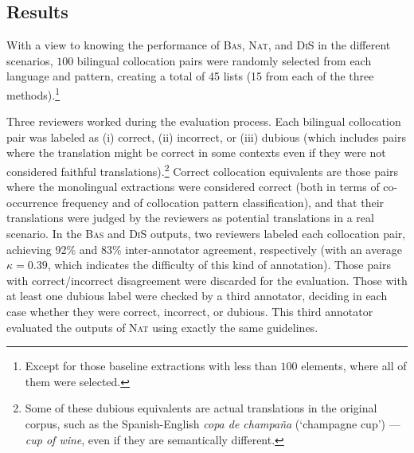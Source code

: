 \documentclass[output=paper
,modfonts
,nonflat]{langsci/langscibook}
\begin{document}
%
\subsection{Results}
With a view to knowing the performance of \textsc{Bas}, \textsc{Nat}, and \textsc{DiS}
in the different scenarios, $100$ bilingual collocation pairs were randomly selected
from each language and pattern, creating a total of 45 lists (15 from each of the three methods).\footnote{Except for those baseline extractions with less than $100$ elements, where all of them were selected.}

Three reviewers worked during the evaluation process. Each bilingual collocation
pair was labeled as (i) correct, (ii) incorrect, or (iii) dubious (which includes pairs where the
translation might be correct in some contexts even if they were not considered faithful
translations).\footnote{Some of these dubious equivalents are actual translations in the
  original corpus, such as the Spanish-English \textit{copa de champaña} (`champagne cup') --- \textit{cup of wine},
  even if they are semantically different.}
Correct collocation equivalents are those pairs where the monolingual extractions were
considered correct (both in terms of co-occurrence frequency and of collocation pattern
classification), and that their translations were judged by the reviewers as potential
translations in a real scenario.
In the \textsc{Bas} and \textsc{DiS} outputs, two reviewers labeled each collocation pair,
achieving 92\% and 83\% inter-annotator agreement, respectively (with an average $\kappa=0.39$, which
indicates the difficulty of this kind of annotation). Those pairs with correct/incorrect disagreement
were discarded for the evaluation. Those with at least one dubious label were checked by a
third annotator, deciding in each case whether they were correct, incorrect, or dubious.
This third annotator evaluated the outputs of \textsc{Nat} using exactly the same guidelines.
\end{document}

